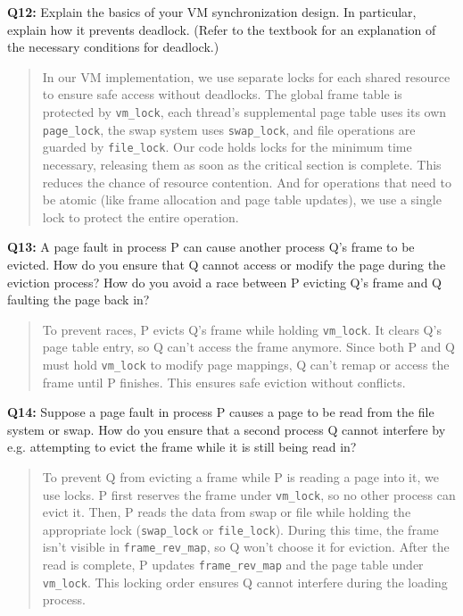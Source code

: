 \documentclass[a4paper,11pt]{paper}
\begin{document}
\textbf{Q12:} Explain the basics of your VM synchronization design.  In particular, explain how it prevents deadlock.  (Refer to the textbook for an explanation of the necessary conditions for deadlock.)
\begin{quote}
In our VM implementation, we use separate locks for each shared resource to ensure safe access without deadlocks. The global frame table is protected by \texttt{vm\_lock}, each thread’s supplemental page table uses its own \texttt{page\_lock}, the swap system uses \texttt{swap\_lock}, and file operations are guarded by \texttt{file\_lock}. Our code holds locks for the minimum time necessary, releasing them as soon as the critical section is complete. This reduces the chance of resource contention. And for operations that need to be atomic (like frame allocation and page table updates), we use a single lock to protect the entire operation.
\end{quote}


\textbf{Q13:} A page fault in process P can cause another process Q's frame to be evicted. How do you ensure that Q cannot access or modify the page during the eviction process?  How do you avoid a race between P evicting Q's frame and Q faulting the page back in?
\begin{quote}
To prevent races, P evicts Q’s frame while holding \texttt{vm\_lock}. It clears Q’s page table entry, so Q can’t access the frame anymore. Since both P and Q must hold \texttt{vm\_lock} to modify page mappings, Q can’t remap or access the frame until P finishes. This ensures safe eviction without conflicts.
\end{quote}

\newpage
\textbf{Q14:} Suppose a page fault in process P causes a page to be read from the file system or swap.  How do you ensure that a second process Q cannot interfere by e.g. attempting to evict the frame while it is still being read in?
\begin{quote}
To prevent Q from evicting a frame while P is reading a page into it, we use locks. P first reserves the frame under \texttt{vm\_lock}, so no other process can evict it. Then, P reads the data from swap or file while holding the appropriate lock (\texttt{swap\_lock} or \texttt{file\_lock}). During this time, the frame isn’t visible in \texttt{frame\_rev\_map}, so Q won’t choose it for eviction. After the read is complete, P updates \texttt{frame\_rev\_map} and the page table under \texttt{vm\_lock}. This locking order ensures Q cannot interfere during the loading process.
\end{quote}
\end{document}
